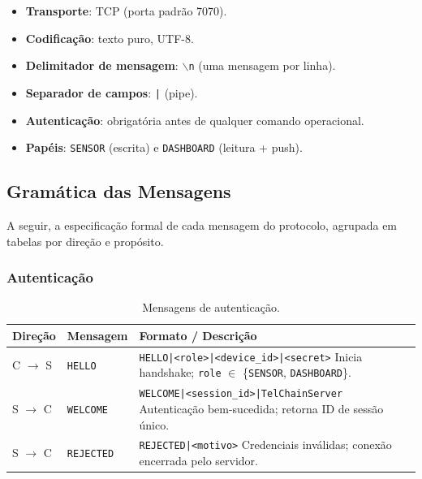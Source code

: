 \documentclass[12pt, a4paper]{article}
\begin{document}
\begin{infobox}
\begin{itemize}[nosep]
  \item \textbf{Transporte}: TCP (porta padrão 7070).
  \item \textbf{Codificação}: texto puro, UTF-8.
  \item \textbf{Delimitador de mensagem}: \texttt{$\backslash$n} (uma mensagem por linha).
  \item \textbf{Separador de campos}: \texttt{|} (pipe).
  \item \textbf{Autenticação}: obrigatória antes de qualquer comando operacional.
  \item \textbf{Papéis}: \texttt{SENSOR} (escrita) e \texttt{DASHBOARD} (leitura + push).
\end{itemize}
\end{infobox}

\subsection{Gramática das Mensagens}

A seguir, a especificação formal de cada mensagem do protocolo, agrupada em tabelas 
por direção e propósito.

\subsubsection{Autenticação}

\begin{table}[H]
\centering
\caption{Mensagens de autenticação.}
\label{tab:auth-msgs}
\begin{tabularx}{\linewidth}{llX}
\toprule
\textbf{Direção} & \textbf{Mensagem} & \textbf{Formato / Descrição} \\
\midrule
C $\to$ S & \texttt{HELLO}    & \texttt{HELLO|<role>|<device\_id>|<secret>} \newline Inicia handshake; \texttt{role} $\in$ \{\texttt{SENSOR}, \texttt{DASHBOARD}\}. \\
\addlinespace
S $\to$ C & \texttt{WELCOME}  & \texttt{WELCOME|<session\_id>|TelChainServer} \newline Autenticação bem-sucedida; retorna ID de sessão único. \\
\addlinespace
S $\to$ C & \texttt{REJECTED} & \texttt{REJECTED|<motivo>} \newline Credenciais inválidas; conexão encerrada pelo servidor. \\
\bottomrule
\end{tabularx}
\end{table}
\end{document}
